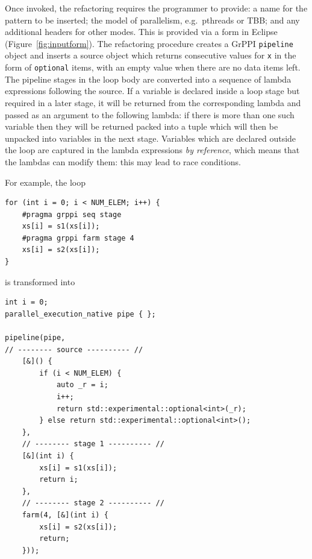 


Once invoked, the refactoring requires the programmer to provide: a name for the pattern to be inserted; the model of parallelism, e.g.\ pthreads or TBB; and any additional headers for other modes. This is provided via a form in Eclipse (Figure~\ref{fig:inputform}).
% 
The refactoring procedure creates a GrPPI \lstinline|pipeline| object and
inserts a source object which returns consecutive values for \texttt{x}
in the form of \texttt{optional} items, with an empty value when there
are no data items left.
%
The pipeline stages in the loop body are converted into a sequence of
lambda expressions following the source. If a variable is declared
inside a loop stage but required in a later stage, it will be returned
from the corresponding lambda and passed as an argument to the following
lambda: if there is more than one such variable then they will be
returned packed into a tuple which will then be unpacked into variables
in the next stage.
%
Variables which are declared outside the loop are captured in the lambda
expressions \emph{by reference}, which means that the lambdas can modify
them: this may lead to race conditions.

For example, the loop
% 
\begin{lstlisting}
for (int i = 0; i < NUM_ELEM; i++) {
    #pragma grppi seq stage
    xs[i] = s1(xs[i]);
    #pragma grppi farm stage 4
    xs[i] = s2(xs[i]);
}
\end{lstlisting}

\noindent
is transformed into
% 
\begin{lstlisting}
int i = 0;
parallel_execution_native pipe { };

pipeline(pipe,
// -------- source ---------- //
    [&]() {
    	if (i < NUM_ELEM) {
    		auto _r = i;
    		i++;
    		return std::experimental::optional<int>(_r);
    	} else return std::experimental::optional<int>();
    },
    // -------- stage 1 ---------- //
    [&](int i) {
    	xs[i] = s1(xs[i]);
    	return i;
    },
    // -------- stage 2 ---------- //
    farm(4, [&](int i) {
    	xs[i] = s2(xs[i]);
    	return;
    }));
\end{lstlisting}

